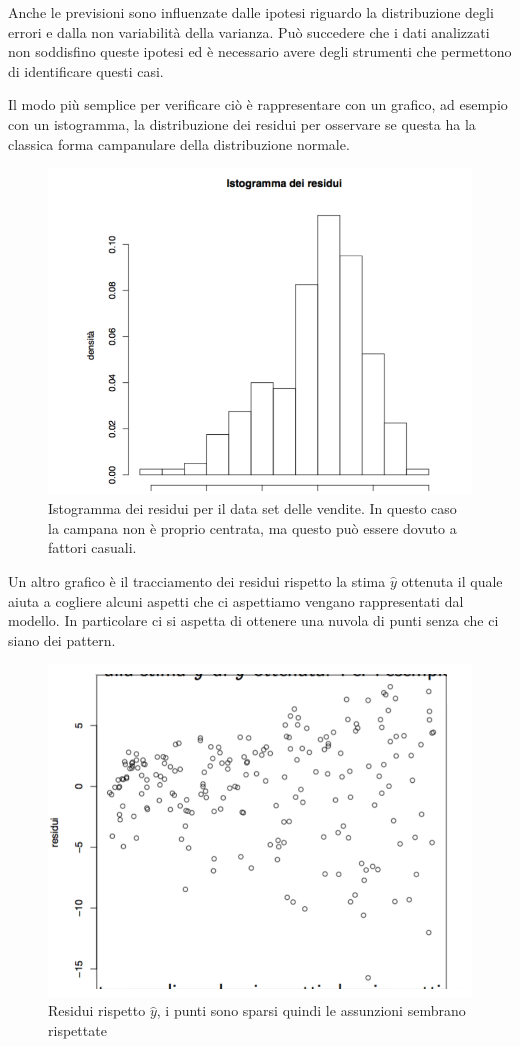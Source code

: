 Anche le previsioni sono influenzate dalle ipotesi riguardo la distribuzione degli errori e dalla non variabilità della varianza.
Può succedere che i dati analizzati non soddisfino queste ipotesi ed è necessario avere degli strumenti che permettono di identificare questi casi.

Il modo più semplice per verificare ciò è rappresentare con un grafico, ad esempio con un istogramma, la distribuzione dei residui per osservare se questa ha la classica forma campanulare della distribuzione normale.

\begin{figure}[htbp]
\centering
\includegraphics[width=.7\textwidth]{./notes/immagini/l6-fig11-1.png}
\caption{Istogramma dei residui per il data set delle vendite. In questo caso la campana non è proprio centrata, ma questo può essere dovuto a fattori casuali.}
\end{figure}

Un altro grafico è il tracciamento dei residui rispetto la stima $ \hat{y} $ ottenuta il quale aiuta a cogliere alcuni aspetti che ci aspettiamo vengano rappresentati dal modello. In particolare ci si aspetta di ottenere una nuvola di punti senza che ci siano dei pattern.

\begin{figure}[htbp]
\centering
\includegraphics[width=.6\textwidth]{./notes/immagini/l6-fig12-1.png}
\caption{Residui rispetto $ \hat{y} $, i punti sono sparsi quindi le assunzioni sembrano rispettate}
\end{figure}

